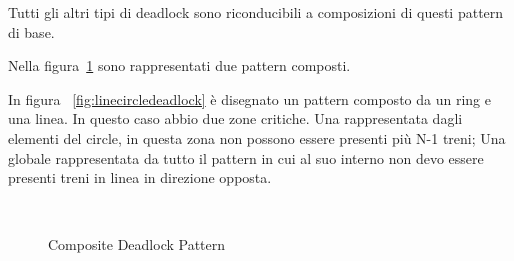 \documentclass{ewic}
\begin{document}
Tutti gli altri tipi di deadlock sono riconducibili a composizioni di questi pattern di base.



Nella figura~\ref{fig:compdeadlockpattern} sono rappresentati due pattern composti.

In figura ~\ref{fig:linecircledeadlock} è disegnato un pattern composto da un ring e una linea. In questo caso abbio due zone critiche. Una rappresentata dagli elementi del circle, in questa zona non possono essere presenti più N-1 treni; Una globale rappresentata da tutto il pattern in cui al suo interno non devo essere presenti treni in linea in direzione opposta.


\begin{figure}[!htp]
 \centering

 
 \\

\caption{Composite Deadlock Pattern}
 \label{fig:compdeadlockpattern}
 \end{figure}
\end{document}
